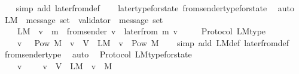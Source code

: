 \begin{isabellebody}
%
\isadelimproof
\ \ %
\endisadelimproof
%
\isatagproof
{}\isamarkupfalse%
\ {\isacharparenleft}simp\ add{\isacharcolon}\ later{\isacharunderscore}from{\isacharunderscore}def{\isacharparenright}\isanewline
\ \ \isamarkupfalse%
\ later{\isacharunderscore}type{\isacharunderscore}for{\isacharunderscore}state\ from{\isacharunderscore}sender{\isacharunderscore}type{\isacharunderscore}for{\isacharunderscore}state\ \isamarkupfalse%
\ auto%
\endisatagproof
{\isafoldproof}%
%
\isadelimproof
\isanewline
%
\endisadelimproof
\isanewline
\isanewline
{}\isamarkupfalse%
\ L{\isacharunderscore}M\ {\isacharcolon}{\isacharcolon}\ {\isachardoublequoteopen}message\ set\ {\isasymRightarrow}\ {\isacharparenleft}validator\ {\isasymRightarrow}\ message\ set{\isacharparenright}{\isachardoublequoteclose}\isanewline
\ \ \isanewline
\ \ \ \ {\isachardoublequoteopen}L{\isacharunderscore}M\ {\isasymsigma}\ v\ {\isacharequal}\ {\isacharbraceleft}m\ {\isasymin}\ from{\isacharunderscore}sender\ {\isacharparenleft}v{\isacharcomma}\ {\isasymsigma}{\isacharparenright}{\isachardot}\ later{\isacharunderscore}from\ {\isacharparenleft}m{\isacharcomma}\ v{\isacharcomma}\ {\isasymsigma}{\isacharparenright}\ {\isacharequal}\ {\isasymemptyset}{\isacharbraceright}{\isachardoublequoteclose}\isanewline
\isanewline
{}\isamarkupfalse%
\ {\isacharparenleft}\ Protocol{\isacharparenright}\ L{\isacharunderscore}M{\isacharunderscore}type\ {\isacharcolon}\isanewline
\ \ {\isachardoublequoteopen}{\isasymforall}\ {\isasymsigma}\ v{\isachardot}\ {\isasymsigma}\ {\isasymin}\ Pow\ M\ {\isasymand}\ v\ {\isasymin}\ V\ {\isasymlongrightarrow}\ L{\isacharunderscore}M\ {\isasymsigma}\ v\ {\isasymin}\ Pow\ M{\isachardoublequoteclose}\isanewline
%
\isadelimproof
\ \ %
\endisadelimproof
%
\isatagproof
{}\isamarkupfalse%
\ {\isacharparenleft}simp\ add{\isacharcolon}\ L{\isacharunderscore}M{\isacharunderscore}def\ later{\isacharunderscore}from{\isacharunderscore}def{\isacharparenright}\isanewline
\ \ \isamarkupfalse%
\ from{\isacharunderscore}sender{\isacharunderscore}type\ \isamarkupfalse%
\ auto%
\endisatagproof
{\isafoldproof}%
%
\isadelimproof
\isanewline
%
\endisadelimproof
\isanewline
{}\isamarkupfalse%
\ {\isacharparenleft}\ Protocol{\isacharparenright}\ L{\isacharunderscore}M{\isacharunderscore}type{\isacharunderscore}for{\isacharunderscore}state\ {\isacharcolon}\isanewline
\ \ {\isachardoublequoteopen}{\isasymforall}\ {\isasymsigma}\ v{\isachardot}\ {\isasymsigma}\ {\isasymin}\ {\isasymSigma}\ {\isasymand}\ v\ {\isasymin}\ V\ {\isasymlongrightarrow}\ L{\isacharunderscore}M\ {\isasymsigma}\ v\ {\isasymsubseteq}\ M{\isachardoublequoteclose}\isanewline

\end{isabellebody}
